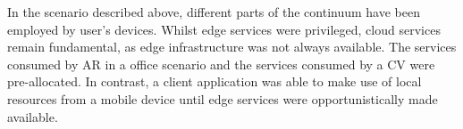 In the scenario described above, different parts of the continuum have been employed by user's devices. Whilst edge services were privileged, cloud services remain fundamental, as edge infrastructure was not always available. The services consumed by AR in a office scenario and the services consumed by a CV were pre-allocated. In contrast, a client application was able to make use of local resources from a mobile device until edge services were opportunistically made available. 

